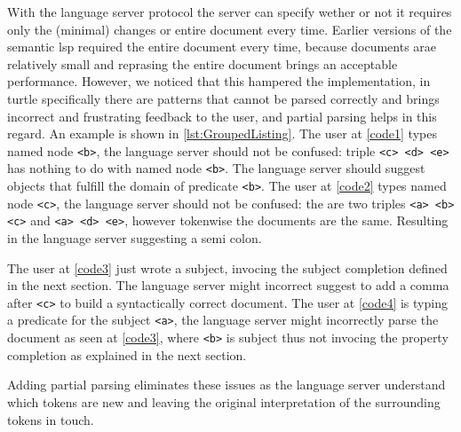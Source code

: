 With the language server protocol the server can specify wether or not it requires only the (minimal) changes or entire document every time.
Earlier versions of the semantic lsp required the entire document every time, because documents arae relatively small and reprasing the entire document brings an acceptable performance.
However, we noticed that this hampered the implementation, in turtle specifically there are patterns that cannot be parsed correctly and brings incorrect and frustrating feedback to the user, and partial parsing helps in this regard.
An example is shown in \ref{lst:GroupedListing}.
  The user at \ref{code1} types named node \texttt{<b>}, the language server should not be confused: triple \texttt{<c> <d> <e>} has nothing to do with named node \texttt{<b>}. The language server should suggest objects that fulfill the domain of predicate \texttt{<b>}. 
  The user at \ref{code2} types named node \texttt{<c>}, the language server should not be confused: the are two triples \texttt{<a> <b> <c>} and \texttt{<a> <d> <e>}, however tokenwise the documents are the same. Resulting in the language server suggesting a semi colon.
  
  The user at \ref{code3} just wrote a subject, invocing the subject completion defined in the next section. The language server might incorrect suggest to add a comma after \texttt{<c>} to build a syntactically correct document.
  The user at \ref{code4} is typing a predicate for the subject \texttt{<a>}, the language server might incorrectly parse the document as seen at \ref{code3}, where \texttt{<b>} is subject thus not invocing the property completion as explained in the next section.

  Adding partial parsing eliminates these issues as the language server understand which tokens are new and leaving the original interpretation of the surrounding tokens in touch.


